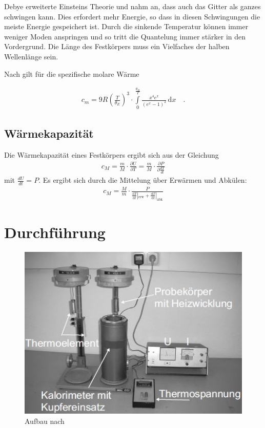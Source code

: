 \documentclass[12pt,a4paper,titlepage,headinclude,bibtotoc]{scrartcl}
\newcommand{\dif}{\ensuremath{\mathrm{d}}}
\begin{document}
Debye erweiterte Einsteins Theorie und nahm an, dass auch das Gitter als ganzes schwingen kann.
Dies erfordert mehr Energie, so dass in diesen Schwingungen die meiste Energie gespeichert ist.
Durch die sinkende Temperatur können immer weniger Moden anspringen und so tritt die Quantelung immer stärker in den Vordergrund.
Die Länge des Festkörpers muss ein Vielfaches der halben Wellenlänge sein.

Nach \cite[S. 444]{demtroeder3} gilt für die spezifische molare Wärme

\begin{align}
	c_m=9R \left(\frac{T}{\theta_E}\right)^3\cdot\int\limits_0^\frac{\theta_D}{T} \frac{x^4 e^x}{(e^x-1)^2} \,\dif x\quad .	\label{eq:debye}
\end{align}


\subsection{Wärmekapazität}
Die Wärmekapazität eines Festkörpers ergibt sich aus der Gleichung
\begin{align}
	c_M=\frac{m}{M}\cdot \frac{\partial U}{\partial T}=\frac{m}{M}\cdot \frac{\partial P}{\partial \frac{dT}{dt}}
\end{align}
mit $\frac{dU}{dt}=P$. Es ergibt sich durch die Mittelung über Erwärmen und Abkülen:
\begin{align}
	c_M=\frac{M}{m}\cdot\frac{P}{\frac{\dif T}{\dif t}|_\text{erw}+\frac{\dif T}{\dif t}|_\text{abk}}\label{eq:molWaerme}
\end{align}

\section{Durchführung}
\label{sec:durchfuehrung}

\begin{figure}[h]
	\centering
	\includegraphics{Aufbau}
	\caption{Aufbau nach \cite[23.4.15, 13 Uhr]{lp25}}
	\label{fig:aufbau}
\end{figure}
\end{document}
